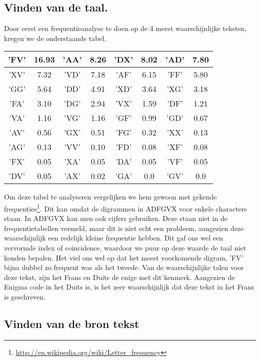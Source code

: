 \documentclass[a4paper,11pt]{article}
\begin{document}
\subsection{Vinden van de taal.}
Door eerst een frequentieanalyse te doen op de 4 meest waarschijnlijke teksten, kregen we de onderstaande tabel.
\begin{center}
\begin{tabular}{|c|c|c|c|c|c|c|c|}
\hline
'FV'& 16.93 &
'AA'& 8.26 &
'DX'& 8.02 &
'AD'& 7.80\\ \hline
'XV'& 7.32 &
'VD'& 7.18 &
'AF'& 6.15 &
'FF'& 5.80\\ \hline
'GG'& 5.64 &
'DD'& 4.91 &
'XD'& 3.64 &
'XG'& 3.18\\ \hline
'FA'& 3.10 &
'DG'& 2.94 &
'VX'& 1.59 &
'DF'& 1.21\\ \hline
'VA'& 1.16 &
'VG'& 1.16 &
'GF'& 0.99 &
'GD'& 0.67\\ \hline
'AV'& 0.56 &
'GX'& 0.51 &
'FG'& 0.32 &
'XX'& 0.13\\ \hline
'AG'& 0.13 &
'VV'& 0.10 &
'FD'& 0.08 &
'XF'& 0.08\\ \hline
'FX'& 0.05 &
'XA'& 0.05 &
'DA'& 0.05 &
'VF'& 0.05\\ \hline
'DV'& 0.05 &
'AX'& 0.02 &
'GA'& 0.0 &
'GV'& 0.0\\ \hline
\end{tabular}

\end{center}

Om deze tabel te analyseren vergelijken we hem gewoon met gekende frequenties\footnote{\url{http://en.wikipedia.org/wiki/Letter_frequency}}. Dit kan omdat de digrammen in ADFGVX voor enkele characters staan. In ADFGVX kan men ook cijfers gebruiken. Deze staan niet in de frequentietabellen vermeld, maar dit is niet echt een probleem, aangezien deze waarschijnlijk een redelijk kleine frequentie hebben. Dit gaf ons wel een vervormde index of coincidence, waardoor we puur op deze waarde de taal niet konden bepalen. Het viel ons wel op dat het meest voorkomende digram, 'FV' bijna dubbel zo frequent was als het tweede. Van de waarschijnlijke talen voor deze tekst, zijn het Frans en Duits de enige met dit kenmerk. Aangezien de Enigma code in het Duits is, is het zeer waarschijnlijk dat deze tekst in het Frans is geschreven.

\subsection{Vinden van de bron tekst}
\end{document}
